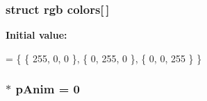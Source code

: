 \subsubsection[{\texorpdfstring{colors}{colors}}]{\setlength{\rightskip}{0pt plus 5cm}struct {\bf rgb} colors\mbox{[}$\,$\mbox{]}}\hypertarget{colors-link-description_8cc_aeede5006703c01b469f27688e8e9827d}{}\label{colors-link-description_8cc_aeede5006703c01b469f27688e8e9827d}
{\bfseries Initial value\+:}
\begin{DoxyCode}
= \{
                        \{ 255, 0, 0 \}, 
                        \{ 0, 255, 0 \}, 
                        \{ 0, 0, 255 \}  
                        \}
\end{DoxyCode}
\subsubsection[{\texorpdfstring{p\+Anim}{pAnim}}]{$\ast$ p\+Anim = 0}\hypertarget{colors-link-description_8cc_a4d1b1f8e5dece91ab32ba77a17ec7978}{}\label{colors-link-description_8cc_a4d1b1f8e5dece91ab32ba77a17ec7978}
